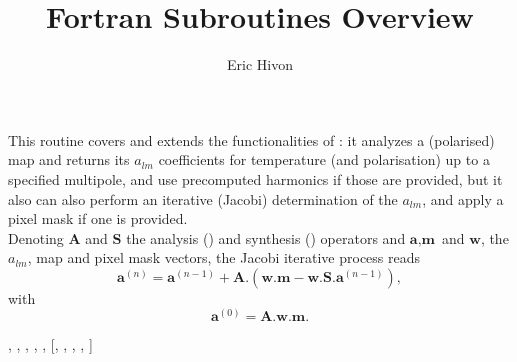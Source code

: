
\sloppy


\title{\healpix Fortran Subroutines Overview}
 \section[map2alm\_iterative*]{ }
\label{sub:map2alm_iterative}
\author{Eric Hivon}

\begin{facility}
{This routine covers and extends the functionalities of : it
analyzes a (polarised)  map and returns
its $a_{lm}$ coefficients for temperature (and polarisation) up to a specified
multipole, and use precomputed harmonics if those
are provided, but it also can also perform an iterative (Jacobi) determination of the $a_{lm}$, and
apply a pixel mask if one is provided.\\
\newcommand{\bA}{\textbf{A}}
\newcommand{\bS}{\textbf{S}}
\newcommand{\ba}{\textbf{a}}
\newcommand{\bm}{\textbf{m}}
\newcommand{\bw}{\textbf{w}}
Denoting $\bA$ and $\bS$ the 
analysis  () and
synthesis ()
operators and  $\ba, \bm$ and $\bw$, the $a_{lm}$, map and pixel mask vectors, the
Jacobi iterative process reads 
\begin{equation}
	\ba^{(n)} = \ba^{(n-1)} + \bA. \left( \bw.\bm - \bw . \bS .\ba^{(n-1)} \right),
\end{equation}
with
\begin{equation}
	\ba^{(0)} = \bA.\bw.\bm.
\end{equation}

}
{\modAlmTools}
\end{facility}

\begin{f90format}
{%
, %
, %
, %
, %
, %
 [, %
, %
 ,
%
, %
]}
\end{f90format}

